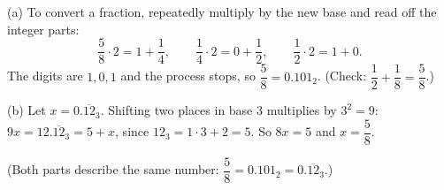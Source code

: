 (a) To convert a fraction, repeatedly multiply by the new base and read off the integer parts:
\[
\dfrac{5}{8}\cdot2=1+\dfrac{1}{4},\qquad\dfrac{1}{4}\cdot2=0+\dfrac{1}{2},\qquad\dfrac{1}{2}\cdot2=1+0 .
\]
The digits are $1,0,1$ and the process stops, so $\dfrac{5}{8}=\boxed{0.101_2}$. (Check: $\dfrac{1}{2}+\dfrac{1}{8}=\dfrac{5}{8}$.)

(b) Let $x=0.\overline{12}_3$. Shifting two places in base $3$ multiplies by $3^2=9$: $9x=12.\overline{12}_3=5+x$, since $12_3=1\cdot3+2=5$. So $8x=5$ and $x=\boxed{\dfrac{5}{8}}$.

(Both parts describe the same number: $\dfrac{5}{8}=0.101_2=0.\overline{12}_3$.)
